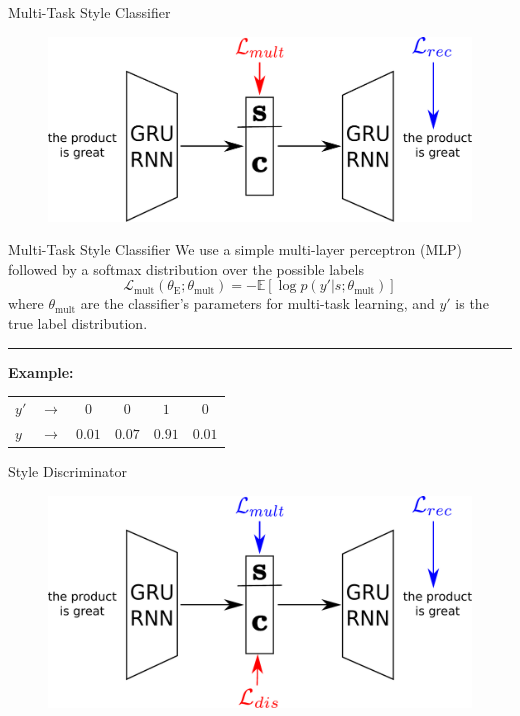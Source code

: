 \documentclass[aspectratio=169]{beamer}
\newcommand{\loss}[1]{\mathcal{L}_{\text{#1}}}
\newcommand{\param}[1]{\theta_{\text{#1}}}
\begin{document}
\begin{frame}{Multi-Task Style Classifier}
	\centering
	\begin{figure}[ht]
		\includegraphics[width=\textwidth]{images/overview-training-2}
	\end{figure}
\end{frame}

\begin{frame}{Multi-Task Style Classifier}
	We use a simple multi-layer perceptron (MLP) followed by a softmax distribution over the possible labels
	\begin{equation*} \label{eqn:multi-task-loss}
		\loss{mult}(\param{E};\param{mult}) = - \mathbb{E} [\log p(y'|s;\param{mult})]
	\end{equation*}
	where $\param{mult}$ are the classifier's parameters for multi-task learning, and $y'$ is the true label distribution.

	\noindent\rule{\textwidth}{0.5pt}

	\centering
	\textbf{Example:}
	\begin{tabular}{ l  c | c | c | c | c |}
		\cline{3-6}
		$y'$ & $\rightarrow$ & $0$    & $0$    & $1$    & $0$    \\
		\cline{3-6}
		$y$  & $\rightarrow$ & $0.01$ & $0.07$ & $0.91$ & $0.01$ \\
		\cline{3-6}
	\end{tabular}
\end{frame}

\begin{frame}{Style Discriminator}
	\centering
	\begin{figure}[ht]
		\includegraphics[width=\textwidth]{images/overview-training-3}
	\end{figure}
\end{frame}
\end{document}
